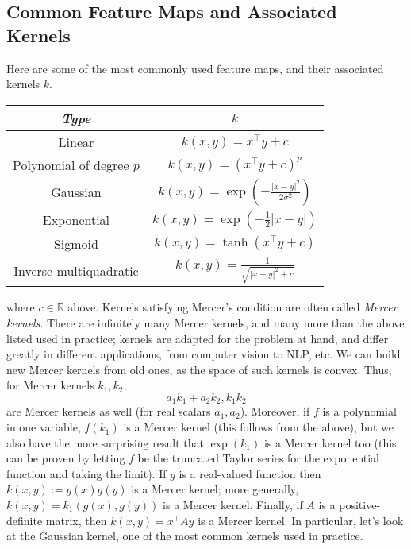 \documentclass{article}
\begin{document}
\subsection{Common Feature Maps and Associated Kernels}
Here are some of the most commonly used feature maps, and their associated kernels $ k $.
\newline
\begin{center}
    \begin{tabular}{c | c}
        \textit{Type} & $ k $ \\
        \hline
        Linear & $ k(x, y) = x^\intercal y + c $ \\
        Polynomial of degree $ p $ & $ k(x, y) = (x^\intercal y + c)^p $ \\
        Gaussian & $ k(x, y) = \exp \left(- \frac{| x - y |^2}{2 \sigma^2} \right) $ \\
        Exponential & $ k(x, y) = \exp(- \frac{1}{2} | x - y |) $ \\
        Sigmoid & $ k(x, y) = \tanh(x^\intercal y + c) $ \\
        Inverse multiquadratic & $ k(x, y) = \frac{1}{\sqrt{| x - y |^2 + c}} $
    \end{tabular}
\end{center}
where $ c \in \mathbb{R} $ above. Kernels satisfying Mercer's condition are often called \textit{Mercer kernels}. There are infinitely many Mercer kernels, and many more than the above listed used in practice; kernels are adapted for the problem at hand, and differ greatly in different applications, from computer vision to NLP, etc. We can build new Mercer kernels from old ones, as the space of such kernels is convex. Thus, for Mercer kernels $ k_1, k_2 $,
$$ a_1 k_1 + a_2 k_2, k_1 k_2 $$
are Mercer kernels as well (for real scalars $ a_1, a_2 $). Moreover, if $ f $ is a polynomial in one variable, $ f(k_1) $ is a Mercer kernel (this follows from the above), but we also have the more surprising result that $ \exp(k_1) $ is a Mercer kernel too (this can be proven by letting $ f $ be the truncated Taylor series for the exponential function and taking the limit). If $ g $ is a real-valued function then $ k(x, y) := g(x) g(y) $ is a Mercer kernel; more generally, $ k(x, y) = k_1(g(x), g(y)) $ is a Mercer kernel. Finally, if $ A $ is a positive-definite matrix, then $ k(x, y) = x^\intercal A y $ is a Mercer kernel.
\newline
In particular, let's look at the Gaussian kernel, one of the most common kernels used in practice.
\newline \newline
\end{document}
